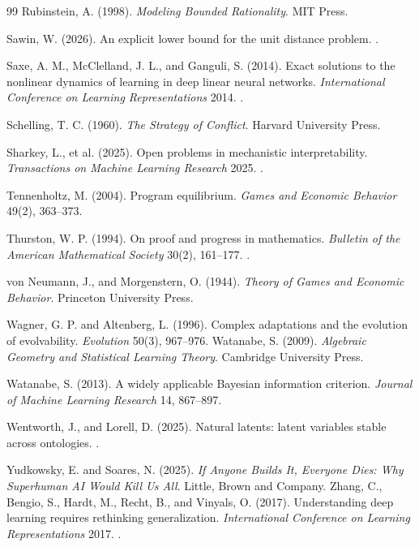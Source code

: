 \begin{thebibliography}{99}
 Rubinstein, A. (1998). \emph{Modeling Bounded Rationality}. MIT Press.


 Sawin, W. (2026). An explicit lower bound for the unit distance problem. .

 Saxe, A. M., McClelland, J. L., and Ganguli, S. (2014). Exact solutions to the nonlinear dynamics of learning in deep linear neural networks. \emph{International Conference on Learning Representations} 2014. .

 Schelling, T. C. (1960). \emph{The Strategy of Conflict}. Harvard University Press.

 Sharkey, L., et al. (2025). Open problems in mechanistic interpretability. \emph{Transactions on Machine Learning Research} 2025. .







 Tennenholtz, M. (2004). Program equilibrium. \emph{Games and Economic Behavior} 49(2), 363--373.


 Thurston, W. P. (1994). On proof and progress in mathematics. \emph{Bulletin of the American Mathematical Society} 30(2), 161--177. .


 von Neumann, J., and Morgenstern, O. (1944). \emph{Theory of Games and Economic Behavior}. Princeton University Press.

 Wagner, G. P. and Altenberg, L. (1996). Complex adaptations and the evolution of evolvability. \emph{Evolution} 50(3), 967--976.
 Watanabe, S. (2009). \emph{Algebraic Geometry and Statistical Learning Theory}. Cambridge University Press.

 Watanabe, S. (2013). A widely applicable Bayesian information criterion. \emph{Journal of Machine Learning Research} 14, 867--897.

 Wentworth, J., and Lorell, D. (2025). Natural latents: latent variables stable across ontologies. .

 Yudkowsky, E. and Soares, N. (2025). \emph{If Anyone Builds It, Everyone Dies: Why Superhuman AI Would Kill Us All}. Little, Brown and Company.
 Zhang, C., Bengio, S., Hardt, M., Recht, B., and Vinyals, O. (2017). Understanding deep learning requires rethinking generalization. \emph{International Conference on Learning Representations} 2017. .


\end{thebibliography}
